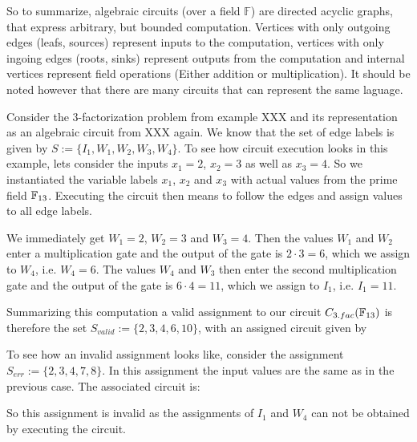 So to summarize, algebraic circuits (over a field $\mathbb{F}$) are directed acyclic graphs, that express arbitrary, but bounded computation. Vertices with only outgoing edges (leafs, sources) represent inputs to the computation, vertices with only ingoing edges (roots, sinks) represent outputs from the computation and internal vertices represent field operations (Either addition or multiplication). It should be noted however that there are many circuits that can represent the same laguage.
\begin{example}[3-factorization] Consider the $3$-factorization problem from example XXX and its representation as an algebraic circuit from XXX again. We know that the set of edge labels is given by $S:=\{I_{1},W_{1},W_{2},W_{3}, W_{4}\}$. To see how circuit execution looks in this example, lets consider the inputs $x_1=2$, $x_2=3$ as well as $x_3=4$. So we instantiated the variable labels $x_1$, $x_2$ and $x_3$ with actual values from the prime field $\mathbb{F}_{13}$. Executing the circuit then means to follow the edges and assign values to all edge labels. 

We immediately get $W_1=2$, $W_2=3$ and $W_3=4$. Then the values $W_1$ and $W_2$ enter a multiplication gate and the output of the gate is $2\cdot 3 = 6$, which we assign to $W_4$, i.e. $W_4=6$. The values $W_4$ and $W_3$ then enter the second multiplication gate and the output of the gate is $6\cdot 4 = 11$, which we assign to $I_1$, i.e. $I_1=11$. 

Summarizing this computation a valid assignment to our circuit $C_{3.fac}(\mathbb{F}_{13})$ is therefore the set $S_{valid}:=\{2,3,4,6,10\}$, with an assigned circuit given by
\begin{center}
\end{center}
To see how an invalid assignment looks like, consider the assignment $S_{err}:=\{2,3,4,7,8\}$. In this assignment the input values are the same as in the previous case. The associated circuit is:
\begin{center}
\end{center}
So this assignment is invalid as the assignments of $I_1$ and $W_4$ can not be obtained by executing the circuit.
\end{example}
